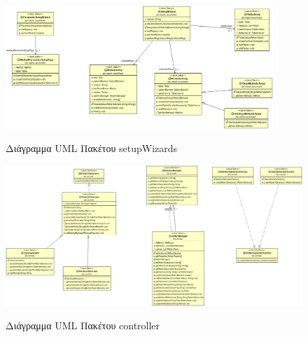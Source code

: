 \begin{figure}[H]
    \centering
    \includegraphics[width=0.9\textwidth]{Figures/setupWizard.png}
    \label{fig:setupWizardUML}
    \caption{Διάγραμμα UML Πακέτου setupWizards}
\end{figure}
\newpage
\begin{figure}[H]
    \centering
    \includegraphics[width=1.0\textwidth]{Figures/controller.png}
    \label{fig:controllerUML}
    \caption{Διάγραμμα UML Πακέτου controller}
\end{figure}
